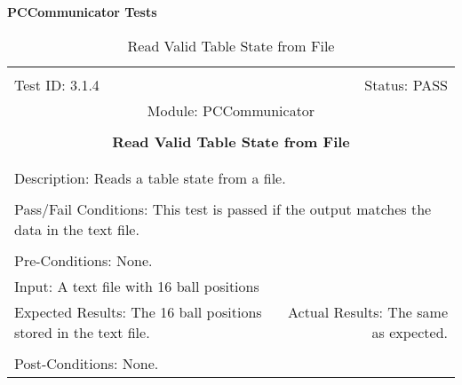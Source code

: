 \documentclass[titlepage]{article}
\begin{document}
\large{\textbf{PCCommunicator Tests}}
\begin{center}
\begin{table}[h!]
\begin{tabular}{|l r|}\hline&\\[-2mm]
	Test ID: 3.1.4	&Status: PASS\\[-3mm]
	\multicolumn{2}{|c|}{Module: PCCommunicator}\\&\\
	\multicolumn{2}{|c|}{\textbf{\large{Read Valid Table State from File}}}\\&\\\hline&\\[-3mm]
	\multicolumn{2}{|p{\textwidth}|}{Description: Reads a table state from a file.}\\[1mm]\hline&\\[-3mm]
	\multicolumn{2}{|p{\textwidth}|}{Pass/Fail Conditions: This test is passed if the output matches the data in the text file.}\\[1mm]\hline&\\[-3mm]
	\multicolumn{2}{|p{\textwidth}|}{Pre-Conditions: None.}\\[4mm]
	\multicolumn{2}{|p{\textwidth}|}{Input: A text file with 16 ball positions}\\[2mm]\hline
	\multicolumn{1}{|p{0.49\textwidth}}{Expected Results: The 16 ball positions stored in the text file.}	&\multicolumn{1}{|p{0.45\textwidth}|}{Actual Results: The same as expected.}\\\hline&\\[-3mm]
	\multicolumn{2}{|p{\textwidth}|}{Post-Conditions: None.}\\\hline
\end{tabular}
\caption{Read Valid Table State from File}
\end{table}
\end{center}
\end{document}
